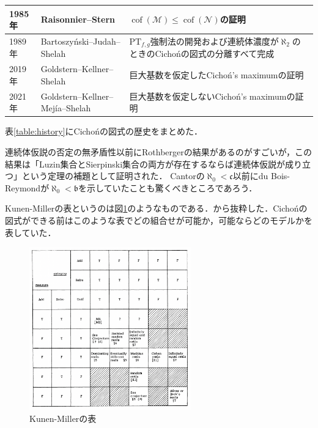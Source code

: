 \documentclass[uplatex,dvipdfmx]{jsarticle}
\newcommand{\cof}{\operatorname{cof}}
\newcommand{\nul}{\mathcal{N}}
\newcommand{\meager}{\mathcal{M}}
\newcommand{\frakc}{\mathfrak{c}}
\newcommand{\frakb}{\mathfrak{b}}
\theoremstyle{definition}
\begin{document}
\begin{table}[h]
\begin{tabular}{@{} l|l|p{8cm}}
			1985年 & Raisonnier--Stern                 & $\cof(\meager) \le \cof(\nul)$の証明                                                                                                                         \\ \hline
			1989年 & Bartoszyński--Judah--Shelah       & $\mathrm{PT}_{f,g}$強制法の開発および連続体濃度が$\aleph_2$のときのCichońの図式の分離すべて完成                                                 \\ \hline
			2019年 & Goldstern--Kellner--Shelah         & 巨大基数を仮定したCichoń's maximumの証明                                                                                                                              \\ \hline
			2021年 & Goldstern--Kellner--Mejía--Shelah & 巨大基数を仮定しないCichoń's maximumの証明                                                                                                                             
		\end{tabular}
	\end{table}

	表\ref{table:history}にCichońの図式の歴史をまとめた．
	
	連続体仮説の否定の無矛盾性以前にRothbergerの結果があるのがすごいが，この結果は「Luzin集合とSierpinski集合の両方が存在するならば連続体仮説が成り立つ」という定理の補題として証明された．
	Cantorの$\aleph_0 < \frakc$以前にdu Bois-Reymondが$\aleph_0 < \frakb$を示していたことも驚くべきところであろう．
	
	Kunen-Millerの表というのは図\ref{fig:kunen-miller}のようなものである．\cite{Miller1981SomePO}から抜粋した．Cichońの図式ができる前はこのような表でどの組合せが可能か，可能ならどのモデルかを表していた．
	
	\begin{figure}[h]\label{fig:kunen-miller}
		\begin{center}
		\includegraphics[width=7cm]{kunen-miller.png}
		\caption{Kunen-Millerの表}
		\end{center}
	\end{figure}
	
\end{document}
